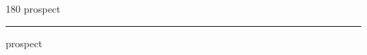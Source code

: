 
\begin{frame}
\begin{center}
\begin{turn}{180}
{\fontsize{2.5cm}{1em}\selectfont prospect}
\end{turn}
\vspace{1em}\par  
\hrule
\vspace{1em}\par  
{\fontsize{2.5cm}{1em}\selectfont prospect}
\end{center}
\end{frame}
